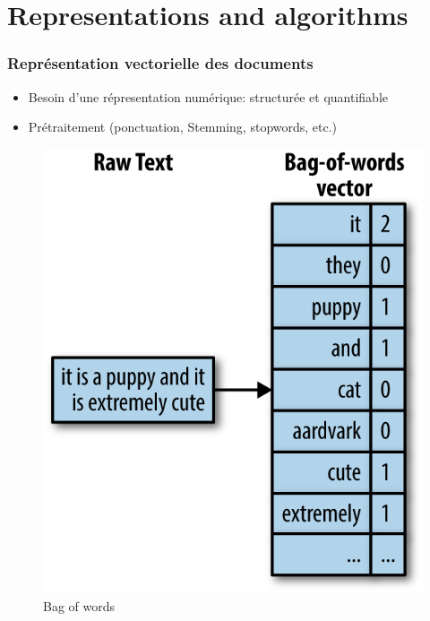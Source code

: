 \documentclass{beamer}
\begin{document}
\section{Representations and algorithms}

\begin{frame}
\frametitle{Représentation vectorielle des documents}
\begin{itemize}
    \item Besoin d'une répresentation numérique: structurée et quantifiable 
    \item Prétraitement (ponctuation, Stemming, stopwords, etc.)
\end{itemize}

\begin{figure}
    \begin{minipage}[b]{0.49\textwidth}
        \centering
        \includegraphics[width=\textwidth]{bag_words.jpeg} 
        \caption{Bag of words}
    \end{minipage}
    \begin{minipage}[b]{0.49\textwidth}
        \centering

\end{minipage}
\end{figure}
\end{frame}
\end{document}
